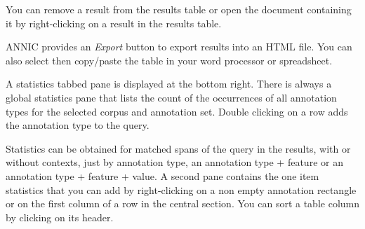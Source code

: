 You can remove a result from the results table or open the document
containing it by right-clicking on a result in the results table.

ANNIC provides an {\em Export} button to export results into an HTML
file. You can also select then copy/paste the table in your word processor
or spreadsheet.

A statistics tabbed pane is displayed at the bottom right. There is always a
global statistics pane that lists the count of the occurrences of all
annotation types for the selected corpus and annotation set. Double clicking
on a row adds the annotation type to the query.

Statistics can be obtained for matched spans of the query in the results,
with or without contexts, just by annotation type, an annotation type +
feature or an annotation type + feature + value. A second pane contains the
one item statistics that you can add by right-clicking on a non empty
annotation rectangle or on the first column of a row in the central
section. You can sort a table column by clicking on its header.



